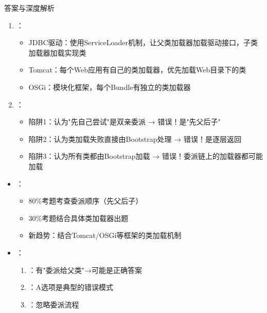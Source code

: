 \documentclass[12pt, a4paper]{ctexart}
\begin{document}
\begin{enumerate}[label=\textbf{\arabic*.}]
\begin{bluebox}{答案与深度解析}
\begin{enumerate}[leftmargin=*, nosep]
			      \item {}：
			            \begin{itemize}
				            \item JDBC驱动：使用ServiceLoader机制，让父类加载器加载驱动接口，子类加载器加载实现类
				            \item Tomcat：每个Web应用有自己的类加载器，优先加载Web目录下的类
				            \item OSGi：模块化框架，每个Bundle有独立的类加载器
			            \end{itemize}

			      \item {}：
			            \begin{itemize}
				            \item 陷阱1：认为"先自己尝试"是双亲委派 → 错误！是"先父后子"
				            \item 陷阱2：认为类加载失败直接由Bootstrap处理 → 错误！是逐层返回
				            \item 陷阱3：认为所有类都由Bootstrap加载 → 错误！委派链上的加载器都可能加载
			            \end{itemize}
		      \end{enumerate}

		      \begin{itemize}[leftmargin=*, nosep]
			      \item {}：
			            \begin{itemize}
				            \item 80\%考题考查委派顺序（先父后子）
				            \item 30\%考题结合具体类加载器出题
				            \item 新趋势：结合Tomcat/OSGi等框架的类加载机制
			            \end{itemize}

			      \item {}：
			            \begin{enumerate}
				            \item {}：有"委派给父类"→可能是正确答案
				            \item {}：A选项是典型的错误模式
				            \item {}：忽略委派流程
			            \end{enumerate}


\end{itemize}
\end{bluebox}
\end{enumerate}
\end{document}
